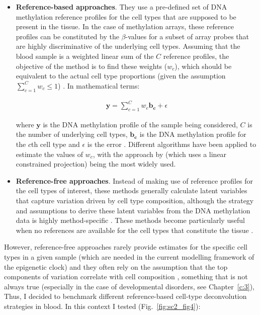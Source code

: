 \begin{itemize}
	
	\item \textbf{Reference-based approaches}. They use a pre-defined set of DNA methylation reference profiles for the cell types that are supposed to be present in the tissue. In the case of methylation arrays, these reference profiles can be constituted by the $\beta$-values for a subset of array probes that are highly discriminative of the underlying cell types. Assuming that the blood sample is a weighted linear sum of the $C$ reference profiles, the objective of the method is to find these weights ($w_c$), which should be equivalent to the actual cell type proportions (given the assumption $\sum_{c=1}^{C} w_c \leq 1$) \citep{Teschendorff2017}. In mathematical terms:
	
	\begin{align}
	\mathbf{y} = \sum_{c=1}^{C} w_c \mathbf{b_c} + \epsilon
	\end{align}
	
	where $\mathbf{y}$ is the DNA methylation profile of the sample being considered, $C$ is the number of underlying cell types, $\mathbf{b_c}$ is the DNA methylation profile for the $c$th cell type and $\epsilon$ is the error \citep{Teschendorff2017a}. Different algorithms have been applied to estimate the values of $w_c$, with the approach by \citet{Houseman2012} (which uses a linear constrained projection)  being the most widely used. 
	
	\item \textbf{Reference-free approaches}. Instead of making use of reference profiles for the cell types of interest, these methods generally calculate latent variables that capture variation driven by cell type composition, although the strategy and assumptions to derive these latent variables from the DNA methylation data is highly method-specific \citep{Teschendorff2017}. These methods become particularly useful when no references are available for the cell types that constitute the tissue \citep{Teschendorff2017}.
	
\end{itemize} 

However, reference-free approaches rarely provide estimates for the specific cell types in a given sample \citep{Teschendorff2017} (which are needed in the current modelling framework of the epigenetic clock) and they often rely on the assumption that the top components of variation correlate with cell composition \citep{Teschendorff2017a}, something that is not always true (especially in the case of developmental disorders, see Chapter~\ref{c:3}), Thus, I decided to benchmark different reference-based cell-type deconvolution strategies in blood. In this context I tested (Fig.~\ref{fig:sc2_fig4}):

